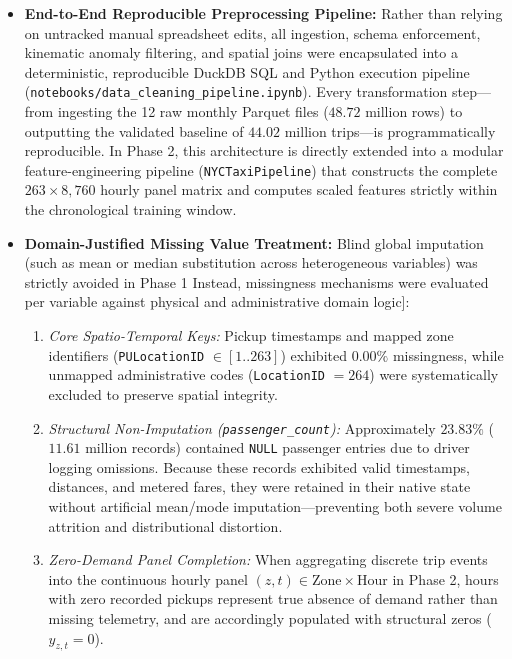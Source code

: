 \documentclass[11pt,a4paper]{article}
\begin{document}
\begin{itemize}
    \item \textbf{End-to-End Reproducible Preprocessing Pipeline:} Rather than relying on untracked manual spreadsheet edits, all ingestion, schema enforcement, kinematic anomaly filtering, and spatial joins were encapsulated into a deterministic, reproducible DuckDB SQL and Python execution pipeline (\texttt{notebooks/data\_cleaning\_pipeline.ipynb}). Every transformation step---from ingesting the 12 raw monthly Parquet files ($48.72$ million rows) to outputting the validated baseline of $44.02$ million trips---is programmatically reproducible. In Phase 2, this architecture is directly extended into a modular feature-engineering pipeline (\texttt{NYCTaxiPipeline}) that constructs the complete $263 \times 8,760$ hourly panel matrix and computes scaled features strictly within the chronological training window.
    
    \item \textbf{Domain-Justified Missing Value Treatment:} Blind global imputation (such as mean or median substitution across heterogeneous variables) was strictly avoided in Phase 1 Instead, missingness mechanisms were evaluated per variable against physical and administrative domain logic]:
    \begin{enumerate}
        \item \textit{Core Spatio-Temporal Keys:} Pickup timestamps and mapped zone identifiers (\texttt{PULocationID} $\in [1..263]$) exhibited $0.00\%$ missingness, while unmapped administrative codes (\texttt{LocationID} $= 264$) were systematically excluded to preserve spatial integrity.
        \item \textit{Structural Non-Imputation (\texttt{passenger\_count}):} Approximately $23.83\%$ ($11.61$ million records) contained \texttt{NULL} passenger entries due to driver logging omissions. Because these records exhibited valid timestamps, distances, and metered fares, they were retained in their native state without artificial mean/mode imputation---preventing both severe volume attrition and distributional distortion.
        \item \textit{Zero-Demand Panel Completion:} When aggregating discrete trip events into the continuous hourly panel $(z, t) \in \text{Zone} \times \text{Hour}$ in Phase 2, hours with zero recorded pickups represent true absence of demand rather than missing telemetry, and are accordingly populated with structural zeros ($y_{z,t} = 0$).
    \end{enumerate}
\end{itemize}
\end{document}
